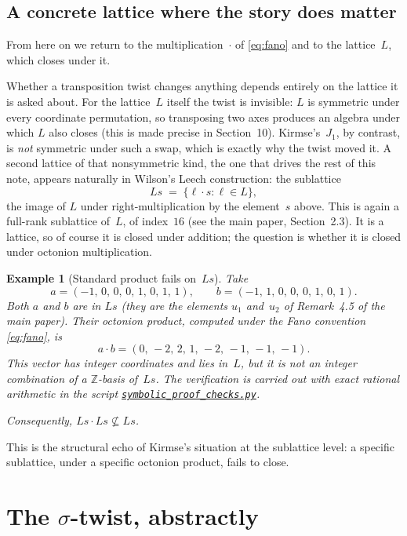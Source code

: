 \documentclass[11pt]{amsart}
\newcommand{\ZZ}{\mathbb{Z}}
\newtheorem{example}{Example}[section]
\begin{document}
\subsection*{A concrete lattice where the story does matter}

From here on we return to the multiplication~$\cdot$ of
\eqref{eq:fano} and to the lattice~$L$, which closes under it.

Whether a transposition twist changes anything depends entirely on the
lattice it is asked about.  For the lattice~$L$ itself the twist is
invisible: $L$ is symmetric under every coordinate permutation, so
transposing two axes produces an algebra under which $L$ also closes
(this is made precise in Section~10).  Kirmse's~$J_1$, by contrast, is
\emph{not} symmetric under such a swap, which is exactly why the
twist moved it.  A second lattice of that nonsymmetric kind, the one
that drives the rest of this note, appears naturally in Wilson's Leech
construction: the sublattice
\[
  Ls \;=\; \{\ell \cdot s : \ell \in L\},
\]
the image of $L$ under right-multiplication by the element~$s$
above.  This is again a full-rank sublattice of~$L$, of index~$16$
(see the main paper, Section~2.3).  It is a lattice, so of course it
is closed under addition; the question is whether it is closed under
octonion multiplication.

\begin{example}[Standard product fails on~$Ls$]\label{ex:Ls-fails}
Take
\[
  a = (-1,\, 0,\, 0,\, 0,\, 1,\, 0,\, 1,\, 1), \qquad
  b = (-1,\, 1,\, 0,\, 0,\, 0,\, 1,\, 0,\, 1).
\]
Both $a$ and $b$ are in $Ls$ (they are the elements $u_1$
and~$u_2$ of Remark~4.5 of the main paper).  Their
octonion product, computed under the Fano convention
\eqref{eq:fano}, is
\[
  a \cdot b = (0,\, -2,\, 2,\, 1,\, -2,\, -1,\, -1,\, -1).
\]
This vector has integer coordinates and lies in~$L$, but it is
\emph{not} an integer combination of a $\ZZ$-basis of~$Ls$.  The
verification is carried out with exact rational arithmetic in the
script
\href{../python_project/src/symbolic_proof_checks.py}{\texttt{symbolic\_proof\_checks.py}}.

Consequently, $Ls \cdot Ls \not\subseteq Ls$.
\end{example}

This is the structural echo of Kirmse's situation at the sublattice
level: a specific sublattice, under a specific octonion product,
fails to close.

\section{The $\sigma$-twist, abstractly}\label{sec:swap}
\end{document}
